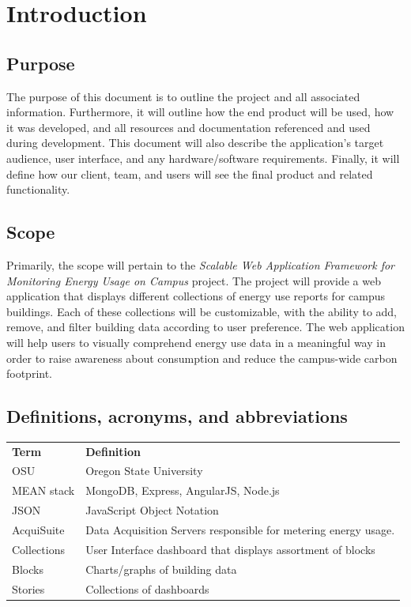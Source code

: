 \documentclass[onecolumn, draftclsnofoot,10pt, compsoc]{IEEEtran}
\begin{document}
    \section{Introduction}
    \subsection{Purpose}
	The purpose of this document is to outline the project and all associated information. Furthermore, it will outline how the end product will be used, how it was developed, and all resources and documentation referenced and used during development. This document will also describe the application’s target audience, user interface, and any hardware/software requirements. Finally, it will define how our client, team, and users will see the final product and related functionality.
    \subsection{Scope}
    Primarily, the scope will pertain to the \textit{Scalable Web Application Framework for Monitoring Energy Usage on Campus}  project. The project will provide a web application that displays different collections of energy use reports for campus buildings. Each of these collections will be customizable, with the ability to add, remove, and filter building data according to user preference. The web application will help users to visually comprehend energy use data in a meaningful way in order to raise awareness about consumption and reduce the campus-wide carbon footprint.
    
    \subsection{Definitions, acronyms, and abbreviations} \label{definition}
	\begin{table}[h]
	\centering
	
	\begin{tabular}{ll}
	\textbf{Term} & \textbf{Definition} \\
	OSU & Oregon State University \\
	MEAN stack & MongoDB, Express, AngularJS, Node.js \\
	JSON & JavaScript Object Notation \\
	AcquiSuite & Data Acquisition Servers responsible for metering energy usage. \\
	Collections & User Interface dashboard that displays assortment of blocks \\
    Blocks & Charts/graphs of building data \\
    Stories & Collections of dashboards 
	\end{tabular}
	\end{table}
\end{document}
